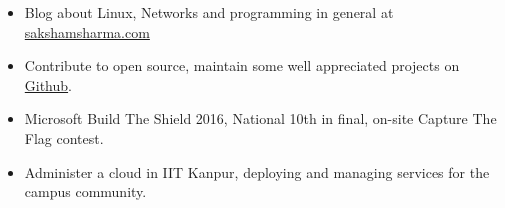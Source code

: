 
{\fontsize{11pt}{1em}\bodyfontlight\upshape\color{text}
\begin{itemize}
  \itemsep-0.3em
  \item Blog about Linux, Networks and programming in
    general at \href{https://sakshamsharma.com}{sakshamsharma.com}
  \item Contribute to open source, maintain some well appreciated
    projects on \href{https://github.com/sakshamsharma}{Github}.
  \item Microsoft Build The Shield 2016, National 10th in final,
    on-site Capture The Flag contest.
  \item Administer a cloud in IIT Kanpur, deploying and managing services for the campus community.
\end{itemize}
}

